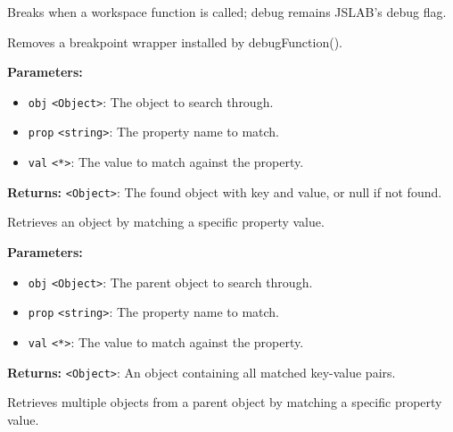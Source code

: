 \documentclass[12pt,a4paper]{article}
\begin{document}
\noindent Breaks when a workspace function is called; \textasciigrave{}debug\textasciigrave{} remains JSLAB's debug flag.

\vspace{5mm}
\noindent {}


\noindent Removes a breakpoint wrapper installed by debugFunction().

\vspace{5mm}
\noindent {}


\noindent \textbf{Parameters:}
\begin{itemize}
  \item \texttt{obj} \texttt{<Object>}: The object to search through.
  \item \texttt{prop} \texttt{<string>}: The property name to match.
  \item \texttt{val} \texttt{<*>}: The value to match against the property.
\end{itemize}

\noindent \textbf{Returns:} \texttt{<Object>}: The found object with key and value, or null if not found.

\noindent Retrieves an object by matching a specific property value.

\vspace{5mm}
\noindent {}


\noindent \textbf{Parameters:}
\begin{itemize}
  \item \texttt{obj} \texttt{<Object>}: The parent object to search through.
  \item \texttt{prop} \texttt{<string>}: The property name to match.
  \item \texttt{val} \texttt{<*>}: The value to match against the property.
\end{itemize}

\noindent \textbf{Returns:} \texttt{<Object>}: An object containing all matched key-value pairs.

\noindent Retrieves multiple objects from a parent object by matching a specific property value.
\end{document}

